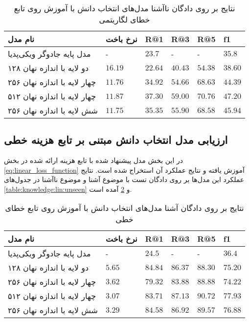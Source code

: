 \begin{table}[h]
	\caption{نتایج بر روی دادگان ناآشنا مدل‌های انتخاب دانش با آموزش روی تابع خطای لگاریتمی }
	\centering
	\label{table:knowledge:log:unseen}
	\begin{tabular}{|l|l|l|l|l|l|}
		\hline
		نام مدل                      & نرخ باخت & R@1     & R@3     & R@5     & f1      \\ \hline
		مدل پایه جادوگر ویکی‌پدیا    & -        & $23.7$  & -       & -       & $35.8$  \\ \hline
		دو لایه با اندازه نهان ۱۲۸   & $16.19$  & $22.64$ & $40.43$ & $54.38$ & $38.60$ \\ \hline
		چهار لایه با اندازه نهان ۲۵۶ & $11.76$  & $34.92$ & $54.66$ & $68.63$ & $44.39$ \\ \hline
		چهار لایه با اندازه نهان ۵۱۲ & $11.87$  & $37.30$ & $59.00$ & $70.76$ & $47.20$ \\ \hline
		شش لایه با اندازه نهان ۲۵۶   & $11.75$  & $35.35$ & $55.90$ & $68.58$ & $45.94$ \\ \hline
	\end{tabular}
\end{table}


\subsection{ارزیابی مدل انتخاب دانش مبتنی بر تابع هزینه خطی}
\label{chap5:lin_eval}

در این بخش مدل‌ پیشنهاد شده با تابع هزینه ارائه شده در بخش 
\ref{eq:linear_loss_function}
آموزش یافته و نتایج عملکرد آن استخراج شده است. نتایج عملکرد این مدل‌ها بر روی دادگان تست با موضوع آشنا و موضوع ناآشنا در جدول‌های 
\ref{table:knowledge:lin:unseen}
و 
\ref{table:knowledge:lin:seen}
آمده است.

\begin{table}[h]
	\caption{نتایج بر روی دادگان آشنا مدل‌های انتخاب دانش با آموزش روی تابع خطای خطی }
	\centering
	\label{table:knowledge:lin:seen}
	\begin{tabular}{|l|l|l|l|l|l|}
		\hline
		نام مدل                      & نرخ باخت & R@1     & R@3     & R@5     & f1      \\ \hline
		مدل پایه جادوگر ویکی‌پدیا    & -       & $24.5$  & -       & -       & $36.4$  \\ \hline
		دو لایه با اندازه نهان ۱۲۸   & $5.65$  & $84.84$ & $86.37$ & $88.30$ & $75.20$ \\ \hline
		چهار لایه با اندازه نهان ۲۵۶ & $3.62$  & $79.32$ & $83.88$ & $88.88$ & $74.22$ \\ \hline
		چهار لایه با اندازه نهان ۵۱۲ & $3.07$  & $83.71$ & $87.13$ & $90.72$ & $77.93$ \\ \hline
		شش لایه با اندازه نهان ۲۵۶   & $3.29$  & $84.58$ & $86.92$ & $89.57$ & $76.88$ \\ \hline
	\end{tabular}
\end{table}

